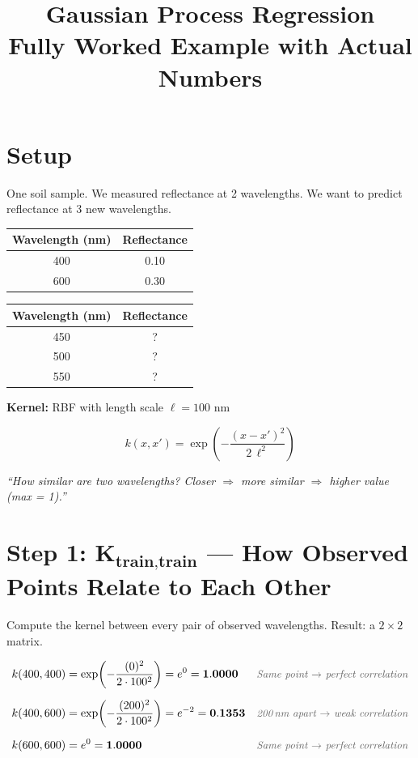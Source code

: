 \documentclass[11pt, a4paper]{article}
\title{\color{secblue}\textbf{Gaussian Process Regression}\\[0.3em]
\Large Fully Worked Example with Actual Numbers}
\author{}
\date{}
\newcommand{\expl}[1]{{\small\color{explgray}\textit{#1}}}
\begin{document}
\maketitle
\thispagestyle{fancy}

\section*{\color{secblue}Setup}

One soil sample. We measured reflectance at 2 wavelengths. We want to predict reflectance at 3 new wavelengths.

\begin{center}
\begin{tabular}{cc}
\toprule
\textbf{Wavelength (nm)} & \textbf{Reflectance} \\
\midrule
400 & 0.10 \\
600 & 0.30 \\
\bottomrule
\end{tabular}
\hspace{2cm}
\begin{tabular}{cc}
\toprule
\textbf{Wavelength (nm)} & \textbf{Reflectance} \\
\midrule
450 & ? \\
500 & ? \\
550 & ? \\
\bottomrule
\end{tabular}
\end{center}

\textbf{Kernel:} RBF with length scale $\ell = 100$ nm

\[
k(x, x') = \exp\!\left( -\frac{(x - x')^2}{2\,\ell^2} \right)
\]

\expl{``How similar are two wavelengths? Closer $\Rightarrow$ more similar $\Rightarrow$ higher value (max = 1).''}


\section*{\color{secblue}Step 1: $\mathbf{K_{\text{train,train}}}$ — How Observed Points Relate to Each Other}

Compute the kernel between every pair of observed wavelengths. Result: a $2 \times 2$ matrix.

\begin{align*}
k(400, 400) &= \exp\!\left(-\frac{(0)^2}{2 \cdot 100^2}\right) = e^{0} = \mathbf{1.0000}
  & \expl{Same point $\rightarrow$ perfect correlation} \\[6pt]
k(400, 600) &= \exp\!\left(-\frac{(200)^2}{2 \cdot 100^2}\right) = e^{-2} = \mathbf{0.1353}
  & \expl{200\,nm apart $\rightarrow$ weak correlation} \\[6pt]
k(600, 600) &= e^{0} = \mathbf{1.0000}
  & \expl{Same point $\rightarrow$ perfect correlation}
\end{align*}
\end{document}
